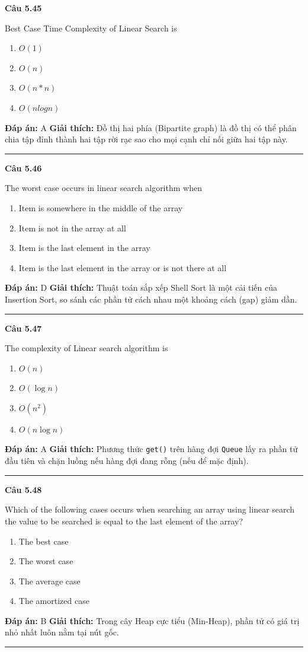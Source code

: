 \documentclass[11pt,a4paper]{article}
\newenvironment{question}[1]{%
  \par\vspace{1em}\noindent\textbf{\large Câu #1}\par\vspace{0.4em}
}{%
  \par\vspace{1em}\hrule\vspace{0.6em}
}
\newenvironment{choices}{%
  \begin{enumerate}[label=\textbf{\Alph*.},leftmargin=2.2em,itemsep=2pt,topsep=3pt]
}{%
  \end{enumerate}
}
\newcommand{\choice}{\item}
\begin{document}
\begin{question}{5.45}
Best Case Time Complexity of Linear Search is
\begin{choices}
\choice $O(1)$
\choice $O(n)$
\choice $O(n * n)$
\choice $O(nlogn)$
\end{choices}
\textbf{Đáp án:} A
\textbf{Giải thích:} Đồ thị hai phía (Bipartite graph) là đồ thị có thể phân chia tập đỉnh thành hai tập rời rạc sao cho mọi cạnh chỉ nối giữa hai tập này.
\end{question}

\begin{question}{5.46}
The worst case occurs in linear search algorithm when
\begin{choices}
\choice Item is somewhere in the middle of the array
\choice Item is not in the array at all
\choice Item is the last element in the array
\choice Item is the last element in the array or is not there at all
\end{choices}
\textbf{Đáp án:} D
\textbf{Giải thích:} Thuật toán sắp xếp Shell Sort là một cải tiến của Insertion Sort, so sánh các phần tử cách nhau một khoảng cách (gap) giảm dần.
\end{question}

\begin{question}{5.47}
The complexity of Linear search algorithm is
\begin{choices}
\choice $O(n)$
\choice $O(\log n)$
\choice $O(n^2)$
\choice $O(n \log n)$
\end{choices}
\textbf{Đáp án:} A
\textbf{Giải thích:} Phương thức \texttt{get()} trên hàng đợi \texttt{Queue} lấy ra phần tử đầu tiên và chặn luồng nếu hàng đợi đang rỗng (nếu để mặc định).
\end{question}

\begin{question}{5.48}
Which of the following cases occurs when searching an array using linear search the value to be searched is equal to the last element of the array?
\begin{choices}
\choice The best case
\choice The worst case
\choice The average case
\choice The amortized case
\end{choices}
\textbf{Đáp án:} B
\textbf{Giải thích:} Trong cây Heap cực tiểu (Min-Heap), phần tử có giá trị nhỏ nhất luôn nằm tại nút gốc.
\end{question}
\end{document}
